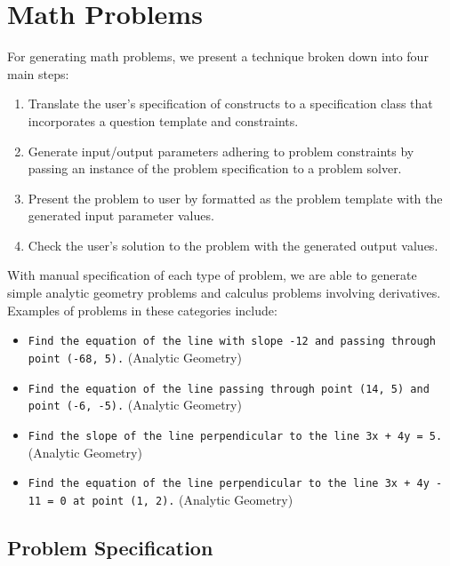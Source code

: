 \section{Math Problems} \label{sec:math}

For generating math problems, we present a technique broken down into four main steps:

\begin{singlespace}
\begin{enumerate}
\item Translate the user's specification of constructs to a specification class that incorporates a question template and constraints.
\item Generate input/output parameters adhering to problem constraints by passing an instance of the problem specification to a problem solver. 
\item Present the problem to user by formatted as the problem template with the generated input parameter values.
\item Check the user's solution to the problem with the generated output values.
\end{enumerate}
\end{singlespace}

With manual specification of each type of problem, we are able to generate simple analytic geometry problems and calculus problems involving derivatives. Examples of problems in these categories include:

\begin{singlespace}
\begin{itemize}
\item \texttt{Find the equation of the line with slope -12 and passing through point (-68, 5).} (Analytic Geometry)
\item \texttt{Find the equation of the line passing through point (14, 5) and point (-6, -5).} (Analytic Geometry)
\item \texttt{Find the slope of the line perpendicular to the line 3x + 4y = 5.} (Analytic Geometry)
\item \texttt{Find the equation of the line perpendicular to the line 3x + 4y - 11 = 0 at point (1, 2).} (Analytic Geometry)
\end{itemize}
\end{singlespace}

\subsection{Problem Specification}


